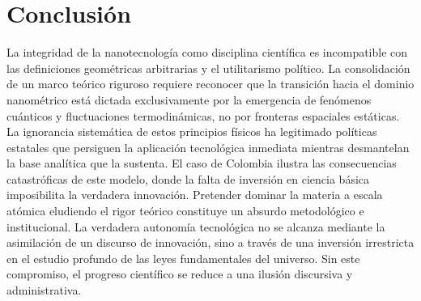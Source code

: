 \section{Conclusión}

La integridad de la nanotecnología como disciplina científica es incompatible
con las definiciones geométricas arbitrarias y el utilitarismo político.
La consolidación de un marco teórico riguroso requiere reconocer que
la transición hacia el dominio nanométrico está dictada exclusivamente por la
emergencia de fenómenos cuánticos y fluctuaciones termodinámicas, no por
fronteras espaciales estáticas. La ignorancia sistemática de estos
principios físicos ha legitimado políticas estatales que persiguen la aplicación
tecnológica inmediata mientras desmantelan la base analítica que la sustenta.
El caso de Colombia ilustra las consecuencias catastróficas de este
modelo, donde la falta de inversión en ciencia básica imposibilita la verdadera
innovación. Pretender dominar la materia a escala atómica eludiendo el
rigor teórico constituye un absurdo metodológico e institucional. La
verdadera autonomía tecnológica no se alcanza mediante la asimilación de un
discurso de innovación, sino a través de una inversión irrestricta en el estudio
profundo de las leyes fundamentales del universo. Sin este compromiso,
el progreso científico se reduce a una ilusión discursiva y administrativa.

